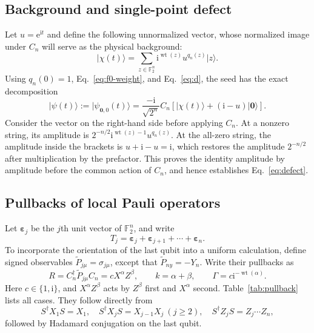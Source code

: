 \documentclass[11pt,a4paper]{article}
\numberwithin{equation}{section}
\theoremstyle{definition}
\newcommand{\F}{\mathbb F}
\newcommand{\ii}{\mathrm i}
\newcommand{\ee}{\mathrm e}
\newcommand{\wt}{\operatorname{wt}}
\newcommand{\ket}[1]{\lvert#1\rangle}
\newcommand{\zero}{\bm 0}
\newcommand{\eps}{\bm\varepsilon}
\begin{document}
\subsection{Background and single-point defect}

Let $u=\ee^{\ii t}$ and define the following unnormalized vector, whose normalized image under $C_n$ will serve as the physical background:
\begin{equation}
 \ket{\chi(t)}=\sum_{z\in\F_2^n}\ii^{\wt(z)}u^{q_n(z)}\ket z.
 \label{eq:background}
\end{equation}
Using $q_n(0)=1$, Eq.~\eqref{eq:f0-weight}, and Eq.~\eqref{eq:d}, the seed has the exact decomposition
\begin{equation}
 \ket{\psi(t)}:=\ket{\psi_{\zero,0}(t)}
 =\frac{-\ii}{\sqrt{2^n}}C_n
 \left[\ket{\chi(t)}+(\ii-u)\ket{\zero}\right].
 \label{eq:defect}
\end{equation}
Consider the vector on the right-hand side before applying $C_n$. At a nonzero string, its amplitude is $2^{-n/2}\ii^{\wt(z)-1}u^{q_n(z)}$. At the all-zero string, the amplitude inside the brackets is $u+\ii-u=\ii$, which restores the amplitude $2^{-n/2}$ after multiplication by the prefactor. This proves the identity amplitude by amplitude before the common action of $C_n$, and hence establishes Eq.~\eqref{eq:defect}.

\subsection{Pullbacks of local Pauli operators}

Let $\eps_j$ be the $j$th unit vector of $\F_2^n$, and write
\begin{equation}
 T_j=\eps_j+\eps_{j+1}+\cdots+\eps_n.
\end{equation}
To incorporate the orientation of the last qubit into a uniform calculation, define signed observables $\widetilde P_{j\mu}=\sigma_{j\mu}$, except that $\widetilde P_{ny}=-Y_n$. Write their pullbacks as
\begin{equation}
 R=C_n^\dagger\widetilde P_{j\mu}C_n
  =cX^\alpha Z^\beta,\qquad
 k=\alpha+\beta,\qquad \Gamma=c\ii^{-\wt(\alpha)}.
 \label{eq:pullnotation}
\end{equation}
Here $c\in\{1,\ii\}$, and $X^\alpha Z^\beta$ acts by $Z^\beta$ first and $X^\alpha$ second. Table~\ref{tab:pullback} lists all cases. They follow directly from
\begin{equation}
 S^\dagger X_1S=X_1,\quad
 S^\dagger X_jS=X_{j-1}X_j\ (j\geq2),\quad
 S^\dagger Z_jS=Z_j\cdots Z_n,
\end{equation}
followed by Hadamard conjugation on the last qubit.
\end{document}
